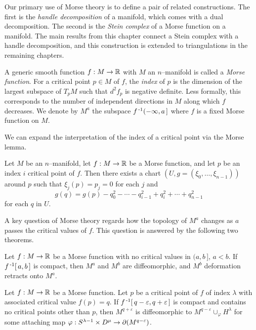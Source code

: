 \label{sec:morsetheory}

Our primary use of Morse theory is to define a pair of related constructions.
The first is the \emph{handle decomposition} of a manifold, which comes with a dual decomposition.
The second is the \emph{Stein complex} of a Morse function on a manifold.
The main results from this chapter connect a Stein complex with a handle decomposition, and this construction is extended to triangulations in the remaining chapters.

\begin{defn}
	A generic smooth function $f:M\to\mathbb{R}$ with $M$ an $n$--manifold is called a \emph{Morse function}.
	For a critical point $p\in M$ of $f$, the \emph{index} of $p$ is the dimension of the largest subspace of $T_p M$ such that $d^2f_p$ is negative definite.
	Less formally, this corresponds to the number of independent directions in $M$ along which $f$ decreases.
	We denote by $M^a$ the subspace $f^{\,\text{-}1}(-\infty,a\,]$ where $f$ is a fixed Morse function on $M$.
\end{defn}

We can expand the interpretation of the index of a critical point via the Morse lemma.

\begin{lem}
  \label{lem:morselemma}
  Let $M$ be an $n$--manifold, let $f:M\to\mathbb{R}$ be a Morse function, and let $p$ be an index $i$ critical point of $f$.
  Then there exists a chart $(U,g=(\xi_0,\dots,\xi_{n-1}))$ around $p$ such that $\xi_j(p)=p_j=0$ for each $j$ and
  \[
    g(q) = g(p) - q_0^2 - \cdots - q_{i-1}^2 + q_i^2 + \cdots + q_{n-1}^2
  \]
  for each $q$ in $U$.
\end{lem}

A key question of Morse theory regards how the topology of $M^a$ changes as $a$ passes the critical values of $f$.
This question is answered by the following two theorems.

\begin{theorem}
	\label{thm:morseretract}
	Let $f:M\to\mathbb{R}$ be a Morse function with no critical values in $(a,b\,]$, $a<b$.
	If $f^{\,\text{-}1}[\,a,b\,]$ is compact, then $M^a$ and $M^b$ are diffeomorphic, and $M^b$ deformation retracts onto $M^a$.
\end{theorem}

\begin{theorem}
	\label{thm:morsehandle}
	Let $f:M\to\mathbb{R}$ be a Morse function.
	Let $p$ be a critical point of $f$ of index $\lambda$ with associated critical value $f(p)=q$.
	If $f^{\,\text{-}1}[\,q-\varepsilon, q+\varepsilon\,]$ is compact and contains no critical points other than $p$, then $M^{q+\varepsilon}$ is diffeomorphic to $M^{q-\varepsilon}\cup_\varphi H^\lambda$ for some attaching map $\varphi:S^{\lambda-1}\times D^\mu\to \partial(M^{q-\varepsilon})$.
\end{theorem}

